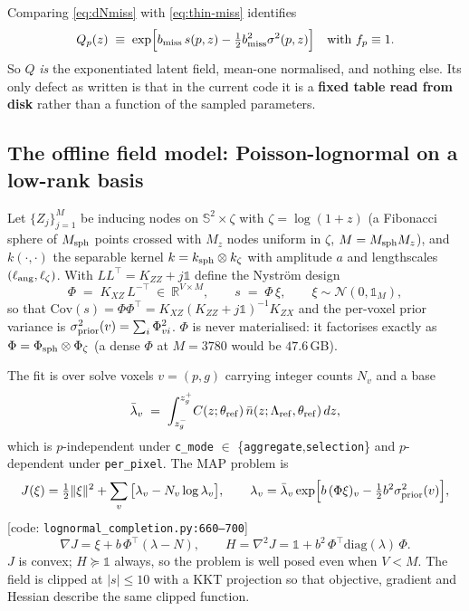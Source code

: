 Comparing \eqref{eq:dNmiss} with \eqref{eq:thin-miss} identifies
\begin{equation}
  Q_p(z)\;\equiv\;\exp\!\Big[b_{\rm miss}\,s(p,z)-\tfrac12 b_{\rm miss}^2\sigma^2(p,z)\Big]
  \quad\text{with } f_p\equiv 1 .
  \label{eq:Qdef}
\end{equation}
So $Q$ \emph{is} the exponentiated latent field, mean-one normalised, and
nothing else.  Its only defect as written is that in the current code it is a
\textbf{fixed table read from disk} rather than a function of the sampled
parameters.

\subsection{The offline field model: Poisson-lognormal on a low-rank basis}

Let $\{Z_j\}_{j=1}^{M}$ be inducing nodes on $\mathbb S^2\times\zeta$ with
$\zeta=\log(1+z)$ (a Fibonacci sphere of $M_{\rm sph}$ points crossed with
$M_z$ nodes uniform in $\zeta$, $M=M_{\rm sph}M_z$), and $k(\cdot,\cdot)$ the
separable kernel $k=k_{\rm sph}\otimes k_{\zeta}$ with amplitude $a$ and
lengthscales $(\ell_{\rm ang},\ell_\zeta)$.  With
$L L^{\!\top}=K_{ZZ}+j\mathbb 1$ define the Nystr\"om design
\begin{equation}
  \Phi \;=\; K_{XZ}\,L^{-\!\top}\ \in\ \mathbb R^{V\times M},
  \qquad
  s \;=\; \Phi\,\xi,\qquad \xi\sim\mathcal N(0,\mathbb 1_M),
  \label{eq:lowrank}
\end{equation}
so that $\mathrm{Cov}(s)=\Phi\Phi^{\!\top}=K_{XZ}(K_{ZZ}+j\mathbb 1)^{-1}K_{ZX}$
and the per-voxel prior variance is
$\sigma^2_{\rm prior}(v)=\sum_i\Phi_{vi}^2$.  $\Phi$ is never materialised: it
factorises exactly as $\Phi=\Phi_{\rm sph}\otimes\Phi_\zeta$ (a dense $\Phi$ at
$M=3780$ would be $47.6$\,GB).

The fit is over solve voxels $v=(p,g)$ carrying integer counts $N_v$ and a base
\begin{equation}
  \bar\lambda_v\;=\;\int_{z_g^-}^{z_g^+}\! C(z;\theta_{\rm ref})\,
  \bar n(z;\Lambda_{\rm ref},\theta_{\rm ref})\,dz ,
  \label{eq:base}
\end{equation}
which is $p$-independent under \verb|c_mode| $\in$
\{\texttt{aggregate},\texttt{selection}\} and $p$-dependent under
\verb|per_pixel|.  The MAP problem is
\begin{equation}
  J(\xi)=\tfrac12\|\xi\|^2+\sum_v\big[\lambda_v-N_v\log\lambda_v\big],
  \qquad
  \lambda_v=\bar\lambda_v\exp\!\Big[b\,(\Phi\xi)_v-\tfrac12 b^2\sigma^2_{\rm prior}(v)\Big],
  \label{eq:Jpoisson}
\end{equation}
\hfill[code: \texttt{lognormal\_completion.py:660--700}]
\begin{equation}
  \nabla J=\xi+b\,\Phi^{\!\top}(\lambda-N),
  \qquad
  H=\nabla^2 J=\mathbb 1+b^2\,\Phi^{\!\top}\mathrm{diag}(\lambda)\,\Phi .
  \label{eq:poissonHess}
\end{equation}
$J$ is convex; $H\succeq\mathbb 1$ always, so the problem is well posed even
when $V<M$.  The field is clipped at $|s|\le10$ with a KKT projection so that
objective, gradient and Hessian describe the same clipped function.

